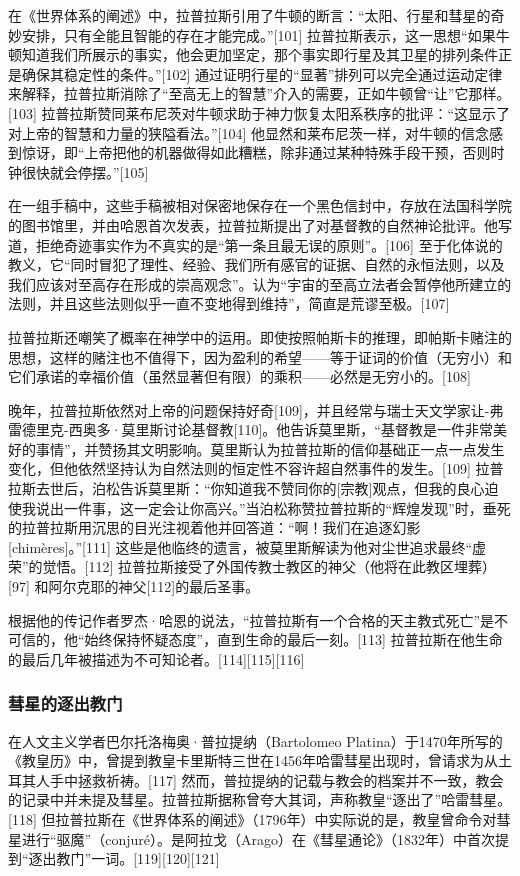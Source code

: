 在《世界体系的阐述》中，拉普拉斯引用了牛顿的断言：“太阳、行星和彗星的奇妙安排，只有全能且智能的存在才能完成。”[101] 拉普拉斯表示，这一思想“如果牛顿知道我们所展示的事实，他会更加坚定，那个事实即行星及其卫星的排列条件正是确保其稳定性的条件。”[102] 通过证明行星的“显著”排列可以完全通过运动定律来解释，拉普拉斯消除了“至高无上的智慧”介入的需要，正如牛顿曾“让”它那样。[103] 拉普拉斯赞同莱布尼茨对牛顿求助于神力恢复太阳系秩序的批评：“这显示了对上帝的智慧和力量的狭隘看法。”[104] 他显然和莱布尼茨一样，对牛顿的信念感到惊讶，即“上帝把他的机器做得如此糟糕，除非通过某种特殊手段干预，否则时钟很快就会停摆。”[105]

在一组手稿中，这些手稿被相对保密地保存在一个黑色信封中，存放在法国科学院的图书馆里，并由哈恩首次发表，拉普拉斯提出了对基督教的自然神论批评。他写道，拒绝奇迹事实作为不真实的是“第一条且最无误的原则”。[106] 至于化体说的教义，它“同时冒犯了理性、经验、我们所有感官的证据、自然的永恒法则，以及我们应该对至高存在形成的崇高观念”。认为“宇宙的至高立法者会暂停他所建立的法则，并且这些法则似乎一直不变地得到维持”，简直是荒谬至极。[107]

拉普拉斯还嘲笑了概率在神学中的运用。即使按照帕斯卡的推理，即帕斯卡赌注的思想，这样的赌注也不值得下，因为盈利的希望——等于证词的价值（无穷小）和它们承诺的幸福价值（虽然显著但有限）的乘积——必然是无穷小的。[108]

晚年，拉普拉斯依然对上帝的问题保持好奇[109]，并且经常与瑞士天文学家让-弗雷德里克-西奥多·莫里斯讨论基督教[110]。他告诉莫里斯，“基督教是一件非常美好的事情”，并赞扬其文明影响。莫里斯认为拉普拉斯的信仰基础正一点一点发生变化，但他依然坚持认为自然法则的恒定性不容许超自然事件的发生。[109] 拉普拉斯去世后，泊松告诉莫里斯：“你知道我不赞同你的[宗教]观点，但我的良心迫使我说出一件事，这一定会让你高兴。”当泊松称赞拉普拉斯的“辉煌发现”时，垂死的拉普拉斯用沉思的目光注视着他并回答道：“啊！我们在追逐幻影[chimères]。”[111] 这些是他临终的遗言，被莫里斯解读为他对尘世追求最终“虚荣”的觉悟。[112] 拉普拉斯接受了外国传教士教区的神父（他将在此教区埋葬）[97] 和阿尔克耶的神父[112]的最后圣事。

根据他的传记作者罗杰·哈恩的说法，“拉普拉斯有一个合格的天主教式死亡”是不可信的，他“始终保持怀疑态度”，直到生命的最后一刻。[113] 拉普拉斯在他生命的最后几年被描述为不可知论者。[114][115][116]
\subsubsection{彗星的逐出教门}  
在人文主义学者巴尔托洛梅奥·普拉提纳（Bartolomeo Platina）于1470年所写的《教皇历》中，曾提到教皇卡里斯特三世在1456年哈雷彗星出现时，曾请求为从土耳其人手中拯救祈祷。[117] 然而，普拉提纳的记载与教会的档案并不一致，教会的记录中并未提及彗星。拉普拉斯据称曾夸大其词，声称教皇“逐出了”哈雷彗星。[118] 但拉普拉斯在《世界体系的阐述》（1796年）中实际说的是，教皇曾命令对彗星进行“驱魔”（conjuré）。是阿拉戈（Arago）在《彗星通论》（1832年）中首次提到“逐出教门”一词。[119][120][121]
